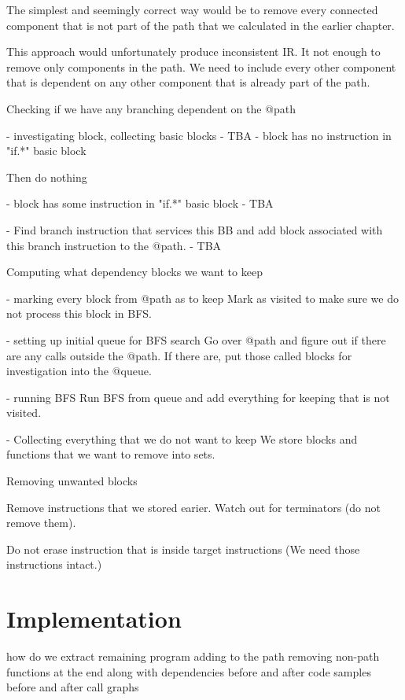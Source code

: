 \documentclass[12pt, twoside]{fithesis2}
\renewcommand{\_}{\leavevmode \kern0.07em\vbox{\hrule width0.4em}}
\begin{document}
The simplest and seemingly correct way would be to remove every connected
component that is not part of the path that we calculated in the earlier
chapter.

This approach would unfortunately produce inconsistent IR. It not enough to
remove only components in the path. We need to include every other component
that is dependent on any other component that is already part of the path.

Checking if we have any branching dependent on the @path

- investigating block, collecting basic blocks
 - TBA
- block has no instruction in "if.*" basic block

Then do nothing

- block has some instruction in "if.*" basic block
 - TBA

- Find branch instruction that services this BB and add block associated with this branch instruction to the @path.
 - TBA

Computing what dependency blocks we want to keep

- marking every block from @path as to keep
Mark as visited to make sure we do not process this block in BFS.

- setting up initial queue for BFS search
Go over @path and figure out if there are any calls outside the @path. If there
are, put those called blocks for investigation into the @queue.

- running BFS
Run BFS from queue and add everything for keeping that is not visited.

- Collecting everything that we do not want to keep
We store blocks and functions that we want to remove into sets.

Removing unwanted blocks

Remove instructions that we stored earier. Watch out for terminators (do not
remove them).

Do not erase instruction that is inside target instructions (We need those
instructions intact.)

\chapter{Implementation}
\label{chap:implementation}

\cite{llvm-writing-pass}
how do we extract remaining program
adding to the path
removing non-path functions at the end
along with dependencies
before and after code samples
before and after call graphs
\end{document}
